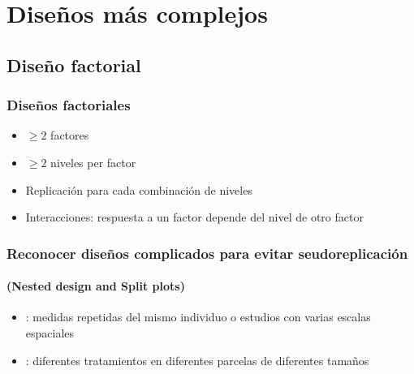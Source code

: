 \documentclass[gray,handout,mathserif]{beamer}
\begin{document}
\section[Otros dise\~nos]{Dise\~nos m\'as complejos}

\subsection[Dise\~no factorial]{Dise\~no factorial}

\begin{frame}[label=factexp]
   \frametitle{Dise\~nos factoriales}
    \begin{itemize}
      \item $\geq2$ factores
      \item $\geq2$ niveles per factor
      \item Replicaci\'on para cada combinaci\'on de niveles
      \item Interacciones: respuesta a un factor depende del nivel de otro factor
   \end{itemize}
\end{frame}%


\begin{frame}[label=nestsplit]
   \frametitle{Reconocer dise\~nos complicados para evitar seudoreplicaci\'on} 
   \framesubtitle{(Nested design and Split plots)} 
   \begin{itemize} 
      \item {}: medidas repetidas del mismo individuo o estudios con varias escalas espaciales 
      \item {}: diferentes tratamientos en diferentes parcelas de diferentes tama\~nos
      \end{itemize}
\end{frame}%
\end{document}
